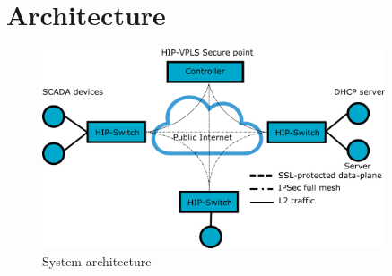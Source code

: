 \chapter{Architecture}

\begin{figure}[h!]
\centering
\includegraphics[width=0.9\textwidth]{graphics/arch.png}
\caption{System architecture}
\label{fig:architecture}
\end{figure}       

